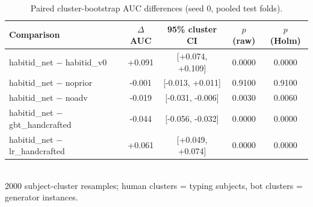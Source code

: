 \begin{table}[t]
\caption{Paired cluster-bootstrap AUC differences (seed 0, pooled test folds).}
\label{tab:boot}
\centering
\small
\begin{tabular}{lcccc}
\toprule
Comparison & $\Delta$AUC & 95\% cluster CI & $p$ (raw) & $p$ (Holm) \\
\midrule
habitid_net $-$ habitid_v0 & +0.091 & [+0.074, +0.109] & 0.0000 & 0.0000 \\
habitid_net $-$ noprior & -0.001 & [-0.013, +0.011] & 0.9100 & 0.9100 \\
habitid_net $-$ noadv & -0.019 & [-0.031, -0.006] & 0.0030 & 0.0060 \\
habitid_net $-$ gbt_handcrafted & -0.044 & [-0.056, -0.032] & 0.0000 & 0.0000 \\
habitid_net $-$ lr_handcrafted & +0.061 & [+0.049, +0.074] & 0.0000 & 0.0000 \\
\bottomrule
\end{tabular}
\\[2pt]\footnotesize 2000 subject-cluster resamples; human clusters = typing subjects, bot clusters = generator instances.
\end{table}
